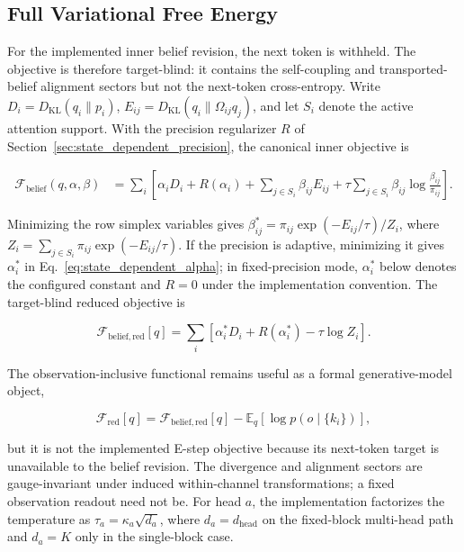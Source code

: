 \documentclass[twoside,11pt]{article}
\begin{document}
\subsection{Full Variational Free Energy}
\label{sec:final_free_energy}

For the implemented inner belief revision, the next token is withheld. The objective is therefore target-blind: it contains the self-coupling and transported-belief alignment sectors but not the next-token cross-entropy. Write $D_i=D_{\mathrm{KL}}(q_i\|p_i)$, $E_{ij}=D_{\mathrm{KL}}(q_i\|\Omega_{ij}q_j)$, and let $S_i$ denote the active attention support. With the precision regularizer $R$ of Section~\ref{sec:state_dependent_precision}, the canonical inner objective is

\begin{equation}
\begin{aligned}
\mathcal{F}_{\mathrm{belief}}(q,\alpha,\beta)
&=\sum_i\left[
\alpha_iD_i+R(\alpha_i)
+\sum_{j\in S_i}\beta_{ij}E_{ij}
+\tau\sum_{j\in S_i}\beta_{ij}\log\frac{\beta_{ij}}{\pi_{ij}}
\right].
\end{aligned}
\label{eq:free_energy_belief}
\end{equation}

Minimizing the row simplex variables gives $\beta_{ij}^*=\pi_{ij}\exp(-E_{ij}/\tau)/Z_i$, where $Z_i=\sum_{j\in S_i}\pi_{ij}\exp(-E_{ij}/\tau)$. If the precision is adaptive, minimizing it gives $\alpha_i^*$ in Eq.~\eqref{eq:state_dependent_alpha}; in fixed-precision mode, $\alpha_i^*$ below denotes the configured constant and $R=0$ under the implementation convention. The target-blind reduced objective is

\begin{equation}
\boxed{
\mathcal{F}_{\mathrm{belief,red}}[q]
=\sum_i\left[
\alpha_i^*D_i+R(\alpha_i^*)-\tau\log Z_i
\right].
}
\label{eq:free_energy_belief_red}
\end{equation}

The observation-inclusive functional remains useful as a formal generative-model object,

\begin{equation}
\mathcal{F}_{\mathrm{red}}[q]
=\mathcal{F}_{\mathrm{belief,red}}[q]
-\mathbb{E}_q[\log p(o\mid\{k_i\})],
\label{eq:free_energy_final}
\end{equation}

but it is not the implemented E-step objective because its next-token target is unavailable to the belief revision. The divergence and alignment sectors are gauge-invariant under induced within-channel transformations; a fixed observation readout need not be. For head $a$, the implementation factorizes the temperature as $\tau_a=\kappa_a\sqrt{d_a}$, where $d_a=d_{\mathrm{head}}$ on the fixed-block multi-head path and $d_a=K$ only in the single-block case.
\end{document}
